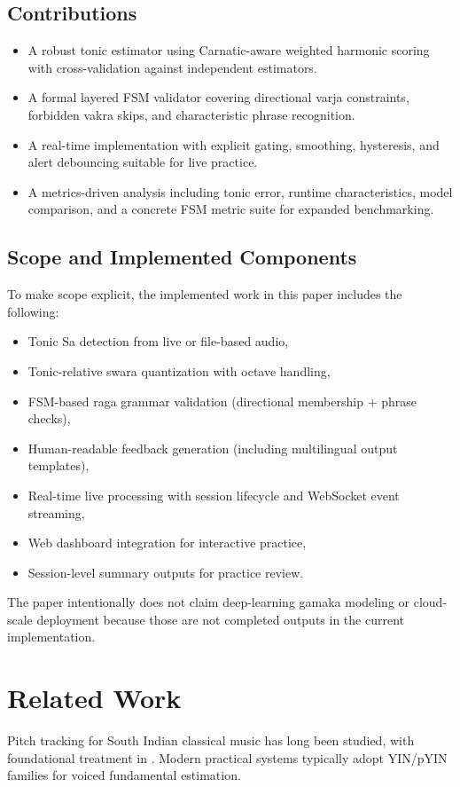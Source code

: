 \documentclass{ieeeaccess}
\begin{document}
\subsection{Contributions}
\begin{itemize}
\item A robust tonic estimator using Carnatic-aware weighted harmonic scoring with cross-validation against independent estimators.
\item A formal layered FSM validator covering directional varja constraints, forbidden vakra skips, and characteristic phrase recognition.
\item A real-time implementation with explicit gating, smoothing, hysteresis, and alert debouncing suitable for live practice.
\item A metrics-driven analysis including tonic error, runtime characteristics, model comparison, and a concrete FSM metric suite for expanded benchmarking.
\end{itemize}

\subsection{Scope and Implemented Components}
To make scope explicit, the implemented work in this paper includes the following:
\begin{itemize}
\item Tonic Sa detection from live or file-based audio,
\item Tonic-relative swara quantization with octave handling,
\item FSM-based raga grammar validation (directional membership + phrase checks),
\item Human-readable feedback generation (including multilingual output templates),
\item Real-time live processing with session lifecycle and WebSocket event streaming,
\item Web dashboard integration for interactive practice,
\item Session-level summary outputs for practice review.
\end{itemize}
The paper intentionally does not claim deep-learning gamaka modeling or cloud-scale deployment because those are not completed outputs in the current implementation.

\section{Related Work}
\label{sec:relatedwork}
Pitch tracking for South Indian classical music has long been studied, with foundational treatment in \cite{b1}. Modern practical systems typically adopt YIN/pYIN families \cite{b2} for voiced fundamental estimation.
\end{document}
